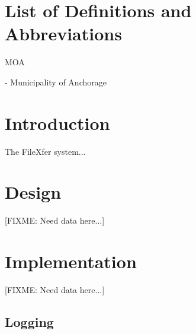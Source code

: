 \documentclass[12pt,letterpaper,dvips]{article}
\newcommand{\FIXME}[1]{\textsf{[FIXME: #1]}}
\newenvironment{itemize*}%
  {\begin{itemize}%
    \setlength{\itemsep}{0pt}%
    \setlength{\parsep}{0pt}}%
  {\end{itemize}}
\begin{document}
\newpage
\listoffigures
\listoftables


\newpage
\setcounter{secnumdepth}{0}
\section{List of Definitions and Abbreviations}
\begin{itemize*}
  \item{\begin{bf}MOA\end{bf}} - Municipality of Anchorage

\end{itemize*}


\newpage
\setcounter{secnumdepth}{2}
\section{Introduction}
The FileXfer system...

\section{Design}
\FIXME{Need data here...}


\section{Implementation}
\FIXME{Need data here...}

\subsection{Logging}


\end{document}
